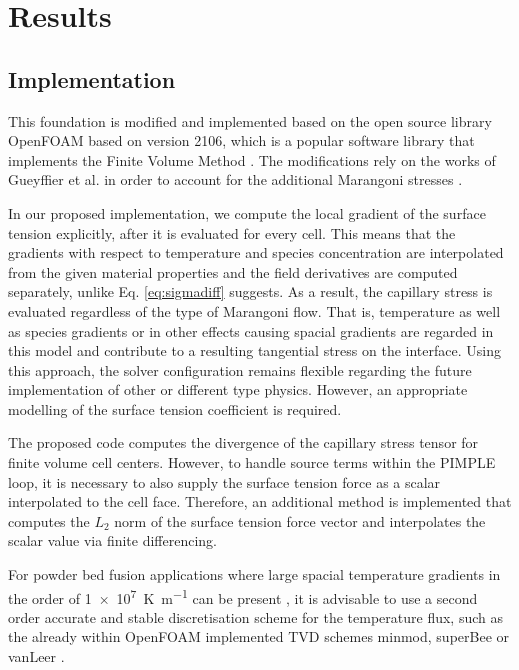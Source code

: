\documentclass[conference,final]{IEEEtran}
\begin{document}
\section{Results}

\subsection{Implementation}

This foundation is modified and implemented based on the open source library OpenFOAM based on version 2106, which is a popular software library that implements the Finite Volume Method \cite{jasakOpenFOAMLibraryComplex2007}. The modifications rely on the works of Gueyffier et al. in order to account for the additional Marangoni stresses \cite{gueyffierVolumeofFluidInterfaceTracking1999}.

In our proposed implementation, we compute the local gradient of the surface tension explicitly, after it is evaluated for every cell. This means that the gradients with respect to temperature and species concentration are interpolated from the given material properties and the field derivatives are computed separately, unlike Eq. \ref{eq:sigmadiff} suggests.
As a result, the capillary stress is evaluated regardless of the type of Marangoni flow. That is, temperature as well as species gradients or in other effects causing spacial gradients are regarded in this model and contribute to a resulting tangential stress on the interface. Using this approach, the solver configuration remains flexible regarding the future implementation of other or different type physics. However, an appropriate modelling of the surface tension coefficient is required.

The proposed code computes the divergence of the capillary stress tensor for finite volume cell centers. However, to handle source terms within the PIMPLE loop, it is necessary to also supply the surface tension force as a scalar interpolated to the cell face. Therefore, an additional method is implemented that computes the $L_2$ norm of the surface tension force vector and interpolates the scalar value via finite differencing.

For powder bed fusion applications where large spacial temperature gradients in the order of \SI[per-mode=fraction]{1e7}{\kelvin \per \metre} can be present \cite{hooperMeltPoolTemperature2018}, it is advisable to use a second order accurate and stable discretisation scheme for the temperature flux, such as the already within OpenFOAM implemented TVD schemes minmod, superBee or vanLeer \cite{roeCharacteristicBasedSchemesEuler1986,vanleerUltimateConservativeDifference1974}.
\end{document}
